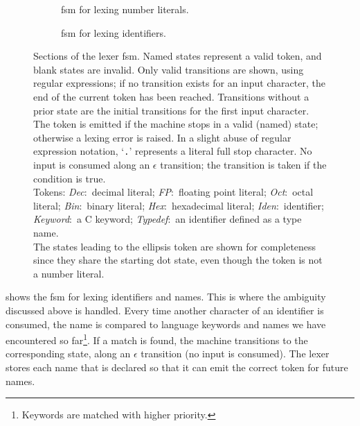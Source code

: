\documentclass[00-main.tex]{subfiles}
\begin{document}
\begin{figure}[p]
  \begin{subfigure}[t]{\textwidth}
    \centering
    \caption{\Gls{fsm} for lexing number literals.}%
    \label{subfig:lexer fsm numbers}
  \end{subfigure}
  \par\vspace{2\bigskipamount}
  \begin{subfigure}[t]{\textwidth}
    \centering
    \caption{\Gls{fsm} for lexing identifiers.}%
    \label{subfig:lexer fsm identifiers}
  \end{subfigure}
  \caption{
    Sections of the lexer \gls{fsm}.
    Named states represent a valid token, and blank states are invalid.
    Only valid transitions are shown, using regular expressions; if no transition exists for an input character, the end of the current token has been reached.
    Transitions without a prior state are the initial transitions for the first input character.
    The token is emitted if the machine stops in a valid (named) state; otherwise a lexing error is raised.
    In a slight abuse of regular expression notation, `\texttt{.}' represents a literal full stop character.
    No input is consumed along an $\epsilon$ transition; the transition is taken if the condition is true. \\
    Tokens: \emph{Dec}:~decimal literal; \emph{FP}:~floating point literal; \emph{Oct}:~octal literal; \emph{Bin}:~binary literal; \emph{Hex}:~hexadecimal literal; \emph{Iden}:~identifier; \emph{Keyword}:~a C keyword; \emph{Typedef}\!:~an identifier defined as a type name. \\
    The states leading to the ellipsis token are shown for completeness since they share the starting dot state, even though the token is not a number literal.
  }%
  \label{fig:lexer fsm}
\end{figure}

 shows the \gls{fsm} for lexing identifiers and  names.
This is where the ambiguity discussed above is handled.
  Every time another character of an identifier is consumed, the name is compared to language keywords and  names we have encountered so far\footnote{Keywords are matched with higher priority.}.
  If a match is found, the machine transitions to the corresponding state, along an $\epsilon$ transition (no input is consumed).
The lexer stores each  name that is declared so that it can emit the correct token for future names.
\end{document}
